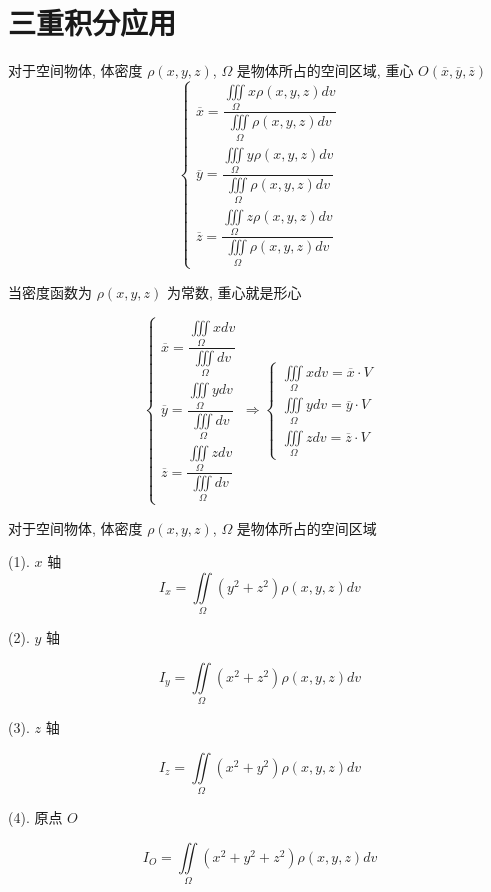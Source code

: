\section{三重积分应用}
\begin{theorem}[重心公式]

	对于空间物体, 体密度 $\rho(x,y,z)$, $\Omega$ 是物体所占的空间区域, 重心 $O(\overline{x}, \overline{y}, \overline{z})$
	$$\begin{cases}
		\overline{x} = \dfrac{\iiint\limits_{\Omega}x\rho(x,y,z)dv}{\iiint\limits_{\Omega}\rho(x,y,z)dv} \\
		\overline{y} = \dfrac{\iiint\limits_{\Omega}y\rho(x,y,z)dv}{\iiint\limits_{\Omega}\rho(x,y,z)dv} \\
		\overline{z} = \dfrac{\iiint\limits_{\Omega}z\rho(x,y,z)dv}{\iiint\limits_{\Omega}\rho(x,y,z)dv}
	\end{cases}$$
	
	当密度函数为 $\rho(x,y,z)$ 为常数, 重心就是形心

	$$\begin{cases}
		\overline{x} = \dfrac{\iiint\limits_{\Omega}xdv}{\iiint\limits_{\Omega}dv} \\
		\overline{y} = \dfrac{\iiint\limits_{\Omega}ydv}{\iiint\limits_{\Omega}dv} \\
		\overline{z} = \dfrac{\iiint\limits_{\Omega}zdv}{\iiint\limits_{\Omega}dv}
	\end{cases}\Rightarrow 
	\begin{cases}
		\iiint\limits_{\Omega}xdv = \overline{x}\cdot V\\
		\iiint\limits_{\Omega}ydv = \overline{y}\cdot V\\
		\iiint\limits_{\Omega}zdv = \overline{z}\cdot V
	\end{cases}$$
\end{theorem}

\begin{theorem}[转动惯量 $I = \sum\limits_{i=1}^{n}m_{i}r_{i}^{2}$]

	对于空间物体, 体密度 $\rho(x,y,z)$, $\Omega$ 是物体所占的空间区域

	(1). $x$ 轴
	$$I_{x} = \iint\limits_{\Omega}(y^{2}+z^{2})\rho(x,y,z)dv$$

	(2). $y$ 轴

	$$I_{y} = \iint\limits_{\Omega}(x^{2}+z^{2})\rho(x,y,z)dv$$

	(3). $z$ 轴

	$$I_{z} = \iint\limits_{\Omega}(x^{2}+y^{2})\rho(x,y,z)dv$$

	(4). 原点 $O$

	$$I_{O} = \iint\limits_{\Omega}(x^{2}+y^{2}+z^{2})\rho(x,y,z)dv$$
\end{theorem}

